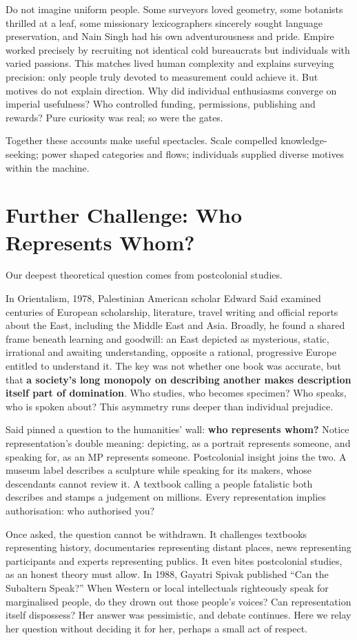 Do not imagine uniform people. Some surveyors loved geometry, some botanists thrilled at a leaf, some missionary lexicographers sincerely sought language preservation, and Nain Singh had his own adventurousness and pride. Empire worked precisely by recruiting not identical cold bureaucrats but individuals with varied passions. This matches lived human complexity and explains surveying precision: only people truly devoted to measurement could achieve it. But motives do not explain direction. Why did individual enthusiasms converge on imperial usefulness? Who controlled funding, permissions, publishing and rewards? Pure curiosity was real; so were the gates.

Together these accounts make useful spectacles. Scale compelled knowledge-seeking; power shaped categories and flows; individuals supplied diverse motives within the machine.

\section{Further Challenge: Who Represents Whom?}
Our deepest theoretical question comes from postcolonial studies.

In Orientalism, 1978, Palestinian American scholar Edward Said examined centuries of European scholarship, literature, travel writing and official reports about the East, including the Middle East and Asia. Broadly, he found a shared frame beneath learning and goodwill: an East depicted as mysterious, static, irrational and awaiting understanding, opposite a rational, progressive Europe entitled to understand it. The key was not whether one book was accurate, but that \textbf{a society's long monopoly on describing another makes description itself part of domination}. Who studies, who becomes specimen? Who speaks, who is spoken about? This asymmetry runs deeper than individual prejudice.

Said pinned a question to the humanities' wall: \textbf{who represents whom?} Notice representation's double meaning: depicting, as a portrait represents someone, and speaking for, as an MP represents someone. Postcolonial insight joins the two. A museum label describes a sculpture while speaking for its makers, whose descendants cannot review it. A textbook calling a people fatalistic both describes and stamps a judgement on millions. Every representation implies authorisation: who authorised you?

Once asked, the question cannot be withdrawn. It challenges textbooks representing history, documentaries representing distant places, news representing participants and experts representing publics. It even bites postcolonial studies, as an honest theory must allow. In 1988, Gayatri Spivak published ``Can the Subaltern Speak?'' When Western or local intellectuals righteously speak for marginalised people, do they drown out those people's voices? Can representation itself dispossess? Her answer was pessimistic, and debate continues. Here we relay her question without deciding it for her, perhaps a small act of respect.

